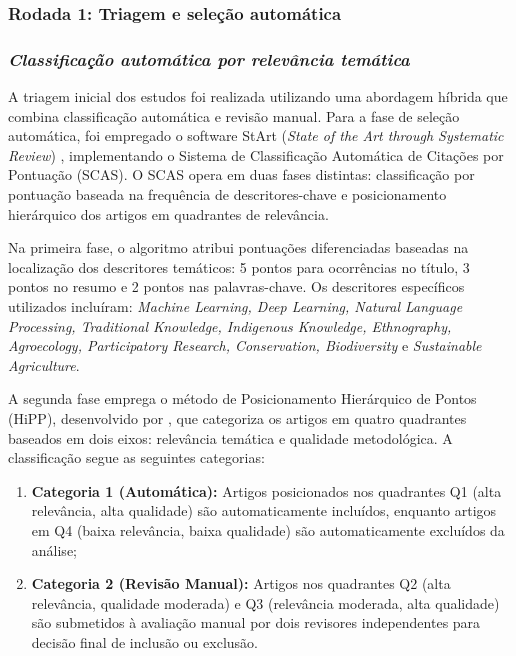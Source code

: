 \subsubsection*{Rodada 1: Triagem e seleção automática}

\subsubsection*{\textit{Classificação automática por relevância temática}}

A triagem inicial dos estudos foi realizada utilizando uma abordagem híbrida que combina classificação automática e revisão manual. Para a fase de seleção automática, foi empregado o software StArt (\textit{State of the Art through Systematic Review}) \cite{Hernandes2012}, implementando o Sistema de Classificação Automática de Citações por Pontuação (SCAS). O SCAS opera em duas fases distintas: classificação por pontuação baseada na frequência de descritores-chave e posicionamento hierárquico dos artigos em quadrantes de relevância.

Na primeira fase, o algoritmo atribui pontuações diferenciadas baseadas na localização dos descritores temáticos: 5 pontos para ocorrências no título, 3 pontos no resumo e 2 pontos nas palavras-chave. Os descritores específicos utilizados incluíram: \textit{Machine Learning, Deep Learning, Natural Language Processing, Traditional Knowledge, Indigenous Knowledge, Ethnography, Agroecology, Participatory Research, Conservation, Biodiversity} e \textit{Sustainable Agriculture}.

A segunda fase emprega o método de Posicionamento Hierárquico de Pontos (HiPP), desenvolvido por , que categoriza os artigos em quatro quadrantes baseados em dois eixos: relevância temática e qualidade metodológica. A classificação segue as seguintes categorias:

\begin{enumerate}
  \item \textbf{Categoria 1 (Automática):} Artigos posicionados nos quadrantes Q1 (alta relevância, alta qualidade) são automaticamente incluídos, enquanto artigos em Q4 (baixa relevância, baixa qualidade) são automaticamente excluídos da análise;

  \item \textbf{Categoria 2 (Revisão Manual):} Artigos nos quadrantes Q2 (alta relevância, qualidade moderada) e Q3 (relevância moderada, alta qualidade) são submetidos à avaliação manual por dois revisores independentes para decisão final de inclusão ou exclusão.
\end{enumerate}

